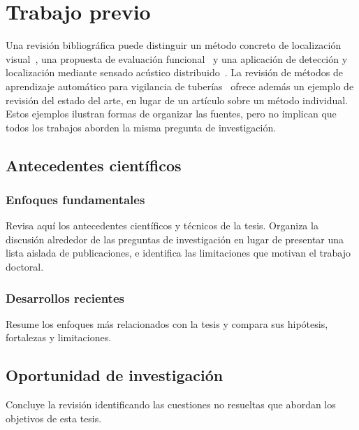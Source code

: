 %

\chapter{Trabajo previo}
\label{cha:compendium-previous-work}

Una revisión bibliográfica puede distinguir un método concreto de localización visual~\cite{Sanabria2026Landmark}, una propuesta de evaluación funcional~\cite{nieva2024proposal} y una aplicación de detección y localización mediante sensado acústico distribuido~\cite{ramirez2026jstars}. La revisión de métodos de aprendizaje automático para vigilancia de tuberías~\cite{tejedor2017machine} ofrece además un ejemplo de revisión del estado del arte, en lugar de un artículo sobre un método individual. Estos ejemplos ilustran formas de organizar las fuentes, pero no implican que todos los trabajos aborden la misma pregunta de investigación.

\section{Antecedentes científicos}
\subsection{Enfoques fundamentales}

Revisa aquí los antecedentes científicos y técnicos de la tesis. Organiza la discusión alrededor de las preguntas de investigación en lugar de presentar una lista aislada de publicaciones, e identifica las limitaciones que motivan el trabajo doctoral.

\subsection{Desarrollos recientes}

Resume los enfoques más relacionados con la tesis y compara sus hipótesis, fortalezas y limitaciones.

\section{Oportunidad de investigación}

Concluye la revisión identificando las cuestiones no resueltas que abordan los objetivos de esta tesis.

